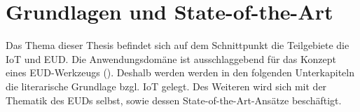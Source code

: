 \chapter{Grundlagen und State-of-the-Art}\label{GrundlagenSOTA}
Das Thema dieser Thesis befindet sich auf dem Schnittpunkt die Teilgebiete die \ac{IoT} und \ac{EUD}. Die Anwendungsdomäne ist ausschlaggebend für das Konzept eines \ac{EUD}-Werkzeugs (\cite{aghaee2013guidelines}). Deshalb werden werden in den folgenden Unterkapiteln die literarische Grundlage bzgl. \ac{IoT} gelegt. Des Weiteren wird sich mit der Thematik des \acp{EUD} selbst, sowie dessen State-of-the-Art-Ansätze beschäftigt.







